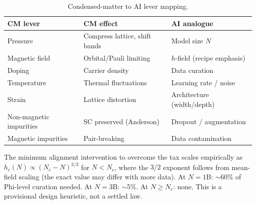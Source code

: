 \documentclass{article}
\begin{document}
\begin{table}[h]
\centering
\caption{Condensed-matter to AI lever mapping.}
\begin{tabular}{lll}
\toprule
CM lever & CM effect & AI analogue \\
\midrule
Pressure & Compress lattice, shift bands & Model size $N$ \\
Magnetic field & Orbital/Pauli limiting & $h$-field (recipe emphasis) \\
Doping & Carrier density & Data curation \\
Temperature & Thermal fluctuations & Learning rate / noise \\
Strain & Lattice distortion & Architecture (width/depth) \\
Non-magnetic impurities & SC preserved (Anderson) & Dropout / augmentation \\
Magnetic impurities & Pair-breaking & Data contamination \\
\bottomrule
\end{tabular}
\end{table}

The minimum alignment intervention to overcome the tax scales empirically as
$h_c(N) \propto (N_c - N)^{3/2}$ for $N < N_c$,
where the $3/2$ exponent follows from mean-field scaling
(the exact value may differ with more data).
At $N = 1$B: $\sim$60\% of Phi-level curation needed.
At $N = 3$B: $\sim$5\%. At $N \geq N_c$: none.
This is a provisional design heuristic, not a settled law.
\end{document}
